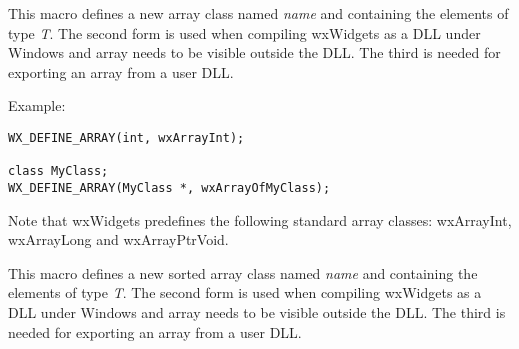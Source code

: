 \\
\\
\\
\\


\\


\label{wxdefinearray}




This macro defines a new array class named {\it name} and containing the
elements of type {\it T}. The second form is used when compiling wxWidgets as
a DLL under Windows and array needs to be visible outside the DLL.  The third is
needed for exporting an array from a user DLL.

Example:

\begin{verbatim}
WX_DEFINE_ARRAY(int, wxArrayInt);

class MyClass;
WX_DEFINE_ARRAY(MyClass *, wxArrayOfMyClass);
\end{verbatim}

Note that wxWidgets predefines the following standard array classes: wxArrayInt,
wxArrayLong and wxArrayPtrVoid.

\label{wxdefinesortedarray}




This macro defines a new sorted array class named {\it name} and containing
the elements of type {\it T}. The second form is used when compiling wxWidgets as
a DLL under Windows and array needs to be visible outside the DLL.  The third is
needed for exporting an array from a user DLL.

